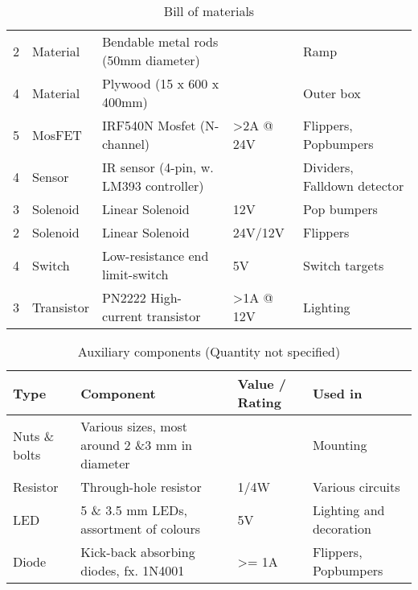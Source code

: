 \begin{table*}[]
\begin{tabular}{@{}lllll@{}}
2                 & Material       & Bendable metal rods (50mm diameter)                  &                         & Ramp                                       \\
4                 & Material       & Plywood (15 x 600 x 400mm)                           &                         & Outer box                                  \\
5                 & MosFET         & IRF540N Mosfet (N-channel)                           & \textgreater{}2A @ 24V  & Flippers, Popbumpers                       \\
4                 & Sensor         & IR sensor (4-pin, w. LM393 controller)               &                         & Dividers, Falldown detector                \\
3                 & Solenoid       & Linear Solenoid                                      & 12V                     & Pop bumpers                                \\
2                 & Solenoid       & Linear Solenoid                                      & 24V/12V                 & Flippers                                   \\
4                 & Switch         & Low-resistance end limit-switch                      & 5V                      & Switch targets                             \\
3                 & Transistor     & PN2222 High-current transistor                       & \textgreater{}1A @ 12V  & Lighting                                   \\ \bottomrule
\end{tabular}
\caption{Bill of materials}
\label{tab:bom}
\end{table*}

\begin{table*}[]
	\centering
	\begin{tabular}{@{}llll@{}}
		\toprule
		\textbf{Type} & \textbf{Component}                              & \textbf{Value / Rating} & \textbf{Used in}        \\ \midrule
		Nuts \& bolts & Various sizes, most around 2 \&3 mm in diameter &                         & Mounting                \\
		Resistor      & Through-hole resistor                           & 1/4W                    & Various circuits        \\
		LED           & 5 \& 3.5 mm LEDs, assortment of colours         & 5V                      & Lighting and decoration \\
		Diode         & Kick-back absorbing diodes, fx. 1N4001          & \textgreater{}= 1A      & Flippers, Popbumpers    \\ \bottomrule
	\end{tabular}
	\caption{Auxiliary components (Quantity not specified)}
	\label{tab:bomaux}
\end{table*}